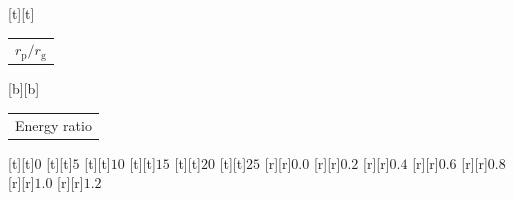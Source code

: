 %    
%
%
\begin{psfrags}%
\psfragscanon%
%
[t][t]{\color[rgb]{0,0,0}\setlength{\tabcolsep}{0pt}\begin{tabular}{c}{\Large$r_\mathrm{p}/r_\mathrm{g}$}\end{tabular}}%
[b][b]{\color[rgb]{0,0,0}\setlength{\tabcolsep}{0pt}\begin{tabular}{c}{\Large{}Energy ratio}\end{tabular}}%
%
[t][t]{$0$}%
[t][t]{$5$}%
[t][t]{$10$}%
[t][t]{$15$}%
[t][t]{$20$}%
[t][t]{$25$}%
%
[r][r]{$0.0$}%
[r][r]{$0.2$}%
[r][r]{$0.4$}%
[r][r]{$0.6$}%
[r][r]{$0.8$}%
[r][r]{$1.0$}%
[r][r]{$1.2$}%
%
%
\end{psfrags}%
%
